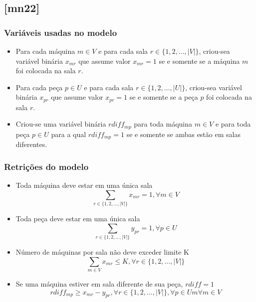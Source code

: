 \documentclass[11pt,letterpaper]{article}
\begin{document}
\subsection{{[}mn22{]}}
\subsubsection*{Variáveis usadas no modelo}
\begin{itemize}
\item Para cada máquina $m \in V$ e para cada sala $r \in
  \{1,2,...,|V|\}$, criou-sea variável binária $x_{mr}$ que assume valor
  $x_{mr}=1$ se e somente se  a máquina $m$
  foi colocada na sala $r$.


\item Para cada peça $p \in U$ e para cada sala $r \in
  \{1,2,...,|U|\}$, criou-sea variável binária $x_{pr}$ que assume valor
  $x_{pr}=1$ se e somente se a peça $p$  foi colocada na sala $r$.

\item Criou-se uma variável binária $rdiff_{mp}$ para
  toda máquina $m \in  V$ e para toda peça $p \in U$ para a qual
  $rdiff_{mp}=1$ se e somente se ambas estão em salas diferentes.

\end{itemize}

\subsubsection*{Retrições do modelo}
\begin{itemize}
\item Toda máquina deve estar em uma única sala
\begin{equation*}
  \sum_{r \in  \{1,2,...,|V|\}}x_{mr}=1, \forall m \in V
\end{equation*}

\item Toda peça deve estar em uma única sala
\begin{equation*}
  \sum_{r \in  \{1,2,...,|V|\}}y_{pr}=1, \forall p \in U
\end{equation*}

\item Número de máquinas por sala não deve exceder limite K
\begin{equation*}
  \sum_{m \in V }x_{mr}\leq K, \forall r \in \{1,2,...,|V|\}
\end{equation*}

\item Se uma máquina estiver em sala diferente de sua peça, $rdiff=1$
\begin{equation*}
  rdiff_{mp}\geq x_{mr}-y_{pr}, \forall r \in \{1,2,...,|V|\}, \forall p \in Um \forall m \in V
\end{equation*}

\end{itemize}
\end{document}
